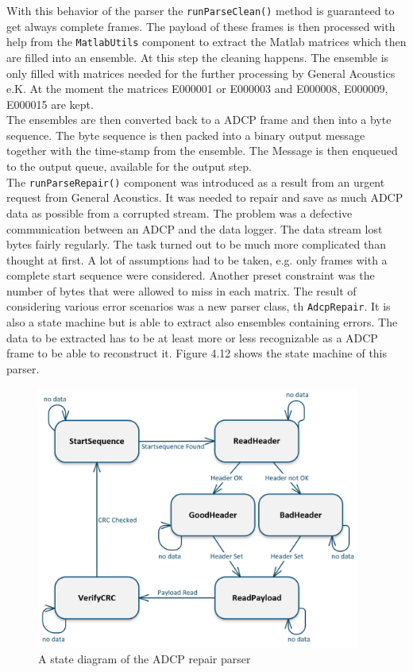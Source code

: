With this behavior of the parser the \texttt{runParseClean()} method is  guaranteed to get always complete frames. The payload of these frames is then processed with help from the \texttt{MatlabUtils} component to extract the Matlab matrices which then are filled into an ensemble. At this step the cleaning happens. The ensemble is only filled with matrices needed for the further processing by General Acoustics e.K. At the moment the matrices E000001 or E000003 and E000008, E000009, E000015 are kept.\\
The ensembles are then converted back to a ADCP frame and then into a byte sequence. The byte sequence is then packed into a binary output message together with the time-stamp from the ensemble. The Message is then enqueued to the output queue, available for the output step.\\

The \texttt{runParseRepair()} component was introduced as a result from an urgent request from General Acoustics. It was needed to repair and save as much ADCP data as possible from a corrupted stream. The problem was a defective communication between an ADCP and the data logger. The data stream lost bytes fairly regularly.
The task turned out to be much more complicated than thought at first. A lot of assumptions had to be taken, e.g. only frames with a complete start sequence were considered. Another preset constraint was the number of bytes that were allowed to miss in each matrix. The result of considering various error scenarios was a new parser class, th \texttt{AdcpRepair}. It is also a state machine but is able to extract also ensembles containing errors. The data to be extracted has to be at least more or less recognizable as a ADCP frame to be able to reconstruct it. Figure 4.12 shows the state machine of this parser.\\

\begin{figure}[h]
\centering
      \includegraphics[width=0.95\textwidth]{repair}
        \caption{A state diagram of the ADCP repair parser}
\end{figure}

